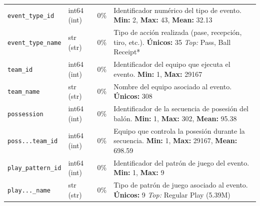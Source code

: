 \documentclass[12pt,a4paper]{article}
\begin{document}
\begin{center}
\begin{longtable}{T{4.3cm} C{2.5cm} C{0.8cm} p{7.0cm}}
\texttt{event\_type\_id} & int64 \newline (int) & 0\% & Identificador numérico del tipo de evento. \newline \textbf{Min:} 2, \textbf{Max:} 43, \textbf{Mean:} 32.13 \\

\texttt{event\_type\_name} & str \newline (str) & 0\% & Tipo de acción realizada (pase, recepción, tiro, etc.). \newline \textbf{Únicos:} 35 \newline \textit{Top:} Pass, Ball Receipt* \\

\texttt{team\_id} & int64 \newline (int) & 0\% & Identificador del equipo que ejecuta el evento. \newline \textbf{Min:} 1, \textbf{Max:} 29167 \\

\texttt{team\_name} & str \newline (str) & 0\% & Nombre del equipo asociado al evento. \newline \textbf{Únicos:} 308 \\

\texttt{possession} & int64 \newline (int) & 0\% & Identificador de la secuencia de posesión del balón. \newline \textbf{Min:} 1, \textbf{Max:} 302, \textbf{Mean:} 95.38 \\

\texttt{poss...team\_id} & int64 \newline (int) & 0\% & Equipo que controla la posesión durante la secuencia. \newline \textbf{Min:} 1, \textbf{Max:} 29167, \textbf{Mean:} 698.59 \\

\texttt{play\_pattern\_id} & int64 \newline (int) & 0\% & Identificador del patrón de juego del evento. \newline \textbf{Min:} 1, \textbf{Max:} 9 \\

\texttt{play...\_name} & str \newline (str) & 0\% & Tipo de patrón de juego asociado al evento. \newline \textbf{Únicos:} 9 \newline \textit{Top:} Regular Play (5.39M) \\


\end{longtable}
\end{center}
\end{document}

